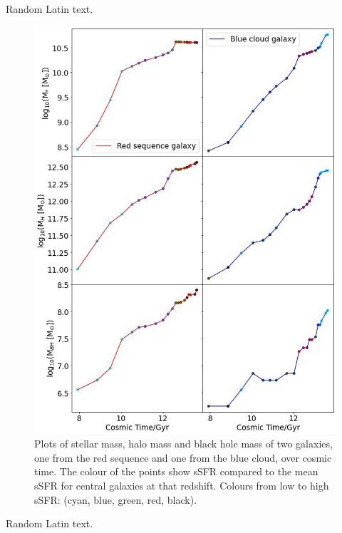 \documentclass[12pt, twocolumn]{revtex4}    %
\begin{document}
\newpage

Random Latin text.

\onecolumngrid


\begin{figure}[H]
\centering
\includegraphics[width=14cm]{Plot_2.jpeg}
\caption{Plots of stellar mass, halo mass and black hole mass of two galaxies, one from the red sequence and one from the blue cloud, over cosmic time. The colour of the points show sSFR compared to the mean sSFR for central galaxies at that redshift. Colours from low to high sSFR: (cyan, blue, green, red, black).}
\label{fig:2}
\end{figure}
\twocolumngrid


\newpage

Random Latin text.

\onecolumngrid
\end{document}
